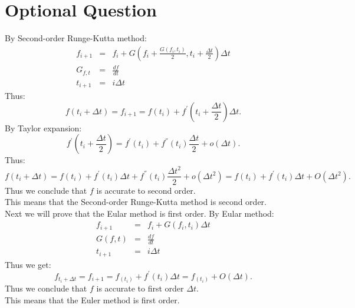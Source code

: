 \documentclass{article}
\begin{document}
\section{Optional Question}
By Second-order Runge-Kutta method:
\begin{eqnarray*}
f_{i+1}&=& f_{i}+G(f_i+\frac{G(f_i,t_i)}{2},t_i+\frac{\Delta t}{2})\Delta t\\
G_{f,t}&=& \frac{df}{dt}\\
t_{i+1}&=& i\Delta t
\end{eqnarray*}
Thus:
$$f(t_{i}+\Delta t)=f_{i+1}=f(t_{i})+f^{'}(t_i+\frac{\Delta t}{2})\Delta t.$$
By Taylor expansion:
$$f^{'}(t_i+\frac{\Delta t}{2})=f^{'}(t_i)+f^{''}(t_i)\frac{\Delta t}{2}+o(\Delta t).$$
Thus:
$$f(t_{i}+\Delta t)=f(t_{i})+f^{'}(t_i)\Delta t+f^{''}(t_i)\frac{\Delta t^2}{2}+o(\Delta t^2)=f(t_{i})+f^{'}(t_i)\Delta t+O(\Delta t^2).$$
Thus we conclude that $f$ is accurate to second order.
\\This means that the Second-order Runge-Kutta method is second order.
\\Next we will prove that the Eular method is first order.
By Eular method:
\begin{eqnarray*}
f_{i+1}&=& f_{i}+G(f_i,t_i)\Delta t\\
G(f,t)&=& \frac{df}{dt}\\
t_{i+1}&=& i\Delta t
\end{eqnarray*}
Thus we get:
$$f_{t_i+\Delta t}=f_{i+1}=f_(t_{i})+f^{'}(t_{i})\Delta t=f_(t_{i})+O(\Delta t).$$
Thus we conclude that $f$ is accurate to first order $\Delta t$.
\\This means that the Euler method is first order.
\end{document}

